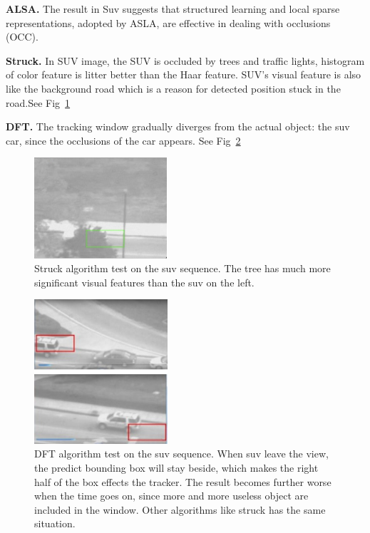 \documentclass{acm_proc_article-sp}
\begin{document}
\textbf{ALSA.} The result in Suv suggests that structured learning and local sparse representations, adopted by ASLA, are effective in dealing with occlusions (OCC).

\textbf{Struck.} In SUV image, the SUV is occluded by trees and traffic lights, histogram of color feature is litter better than the Haar feature.
SUV's visual feature is also like the background road which is a reason for detected position stuck in the road.See Fig~\ref{fig:struck_suv}

\textbf{DFT.} The tracking window gradually diverges from the actual object: the suv car, since the occlusions of the car appears. See Fig~\ref{fig:dft_suv}

\begin{figure}[hbt]
	\centering
    \includegraphics[width=140pt]{struck_suv}
    \caption{Struck algorithm test on the suv sequence. The tree has much more significant visual features than the suv on the left.}
    \label{fig:struck_suv}
\end{figure}

\begin{figure}[hbt]
	\centering
    \includegraphics[width=140pt]{dft_suv}
    \caption{DFT algorithm test on the suv sequence. When suv leave the view, the predict bounding box will stay beside, which makes the right half of the box effects the tracker. The result becomes further worse when the time goes on, since more and more useless object are included in the window. Other algorithms like struck has the same situation.}
    \label{fig:dft_suv}
\end{figure}
\end{document}
